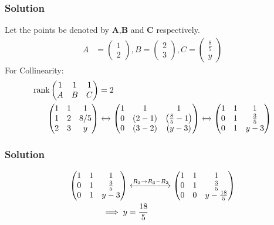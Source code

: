 \documentclass{beamer}
\begin{document}
\begin{frame}
\frametitle{Solution}
Let the points be denoted by $\textbf{A}$,$\textbf{B}$ and $\textbf{C}$ respectively.
\begin{align}
  A &= \begin{pmatrix}
        1\\
        2
    \end{pmatrix}  ,
    B = \begin{pmatrix}
        2\\
        3
    \end{pmatrix},
  C = \begin{pmatrix}
        \frac{8}{5}\\
        y
    \end{pmatrix}
    \end{align}
    For Collinearity:
    \begin{align}
          \text{rank}\begin{pmatrix}
        1 & 1 & 1\\
        A & B & C
    \end{pmatrix} &=2 \label{10}\\
    \begin{pmatrix}
        1 & 1 & 1\\
        1 & 2 & 8/5\\
        2 & 3 & y
    \end{pmatrix} &\xleftrightarrow{}
    \begin{pmatrix}
        1 & 1 & 1\\
        0 & \left(2-1\right) & \left(\frac{8}{5}-1\right)\\
        0 & \left(3-2\right) & \left(y-3\right)
    \end{pmatrix}\xleftrightarrow{}
    \begin{pmatrix}
        1 & 1 & 1\\
        0 & 1 & \frac{3}{5}\\
        0 & 1 & y-3
    \end{pmatrix}
\end{align}
\end{frame}




\begin{frame}
\frametitle{Solution}
\begin{align}
 \begin{pmatrix}
        1 & 1 & 1\\
        0 & 1 & \frac{3}{5}\\
        0 & 1 & y-3
    \end{pmatrix}
   & \xleftrightarrow{R_3\rightarrow R_3-R_2}
    \begin{pmatrix}
        1 & 1 & 1\\
        0 & 1 & \frac{3}{5}\\
        0 & 0 & y-\frac{18}{5}
    \end{pmatrix}\\
    \implies y &= \frac{18}{5}
\end{align}
\end{frame}
\end{document}
